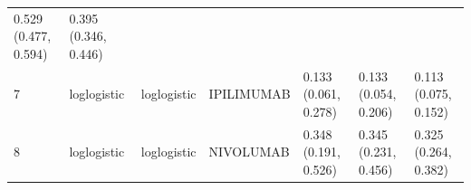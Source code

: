 \documentclass[
]{article}
\begin{document}
\begin{longtable}[]{@{}lllllll@{}}
\begin{minipage}[t]{0.15\columnwidth}
0.529 (0.477, 0.594)\strut
\end{minipage} & \begin{minipage}[t]{0.15\columnwidth}\raggedright
0.395 (0.346, 0.446)\strut
\end{minipage}\tabularnewline
\begin{minipage}[t]{0.03\columnwidth}\raggedright
7\strut
\end{minipage} & \begin{minipage}[t]{0.09\columnwidth}\raggedright
loglogistic\strut
\end{minipage} & \begin{minipage}[t]{0.09\columnwidth}\raggedright
loglogistic\strut
\end{minipage} & \begin{minipage}[t]{0.15\columnwidth}\raggedright
IPILIMUMAB\strut
\end{minipage} & \begin{minipage}[t]{0.15\columnwidth}\raggedright
0.133 (0.061, 0.278)\strut
\end{minipage} & \begin{minipage}[t]{0.15\columnwidth}\raggedright
0.133 (0.054, 0.206)\strut
\end{minipage} & \begin{minipage}[t]{0.15\columnwidth}\raggedright
0.113 (0.075, 0.152)\strut
\end{minipage}\tabularnewline
\begin{minipage}[t]{0.03\columnwidth}\raggedright
8\strut
\end{minipage} & \begin{minipage}[t]{0.09\columnwidth}\raggedright
loglogistic\strut
\end{minipage} & \begin{minipage}[t]{0.09\columnwidth}\raggedright
loglogistic\strut
\end{minipage} & \begin{minipage}[t]{0.15\columnwidth}\raggedright
NIVOLUMAB\strut
\end{minipage} & \begin{minipage}[t]{0.15\columnwidth}\raggedright
0.348 (0.191, 0.526)\strut
\end{minipage} & \begin{minipage}[t]{0.15\columnwidth}\raggedright
0.345 (0.231, 0.456)\strut
\end{minipage} & \begin{minipage}[t]{0.15\columnwidth}\raggedright
0.325 (0.264, 0.382)\strut
\end{minipage}\tabularnewline

\end{longtable}
\end{document}
